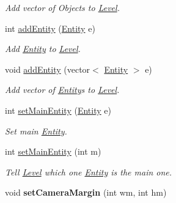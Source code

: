 \begin{DoxyCompactItemize}
\begin{DoxyCompactList}\small\item\em Add vector of Objects to \hyperlink{classLevel}{Level}. \end{DoxyCompactList}\item 
int \hyperlink{classLevel_a9345e51c6abbc422864bf6954c5f6312}{add\+Entity} (\hyperlink{classEntity}{Entity} e)\hypertarget{classLevel_a9345e51c6abbc422864bf6954c5f6312}{}\label{classLevel_a9345e51c6abbc422864bf6954c5f6312}

\begin{DoxyCompactList}\small\item\em Add \hyperlink{classEntity}{Entity} to \hyperlink{classLevel}{Level}. \end{DoxyCompactList}\item 
void \hyperlink{classLevel_a6c4584d5aa383888461406de600a43c1}{add\+Entity} (vector$<$ \hyperlink{classEntity}{Entity} $>$ e)\hypertarget{classLevel_a6c4584d5aa383888461406de600a43c1}{}\label{classLevel_a6c4584d5aa383888461406de600a43c1}

\begin{DoxyCompactList}\small\item\em Add vector of \hyperlink{classEntity}{Entity}\textquotesingle{}s to \hyperlink{classLevel}{Level}. \end{DoxyCompactList}\item 
int \hyperlink{classLevel_afc8426f1adb6037dd71b26e4bd63db92}{set\+Main\+Entity} (\hyperlink{classEntity}{Entity} e)\hypertarget{classLevel_afc8426f1adb6037dd71b26e4bd63db92}{}\label{classLevel_afc8426f1adb6037dd71b26e4bd63db92}

\begin{DoxyCompactList}\small\item\em Set main \hyperlink{classEntity}{Entity}. \end{DoxyCompactList}\item 
int \hyperlink{classLevel_ab7cf0af8d8c89da5a2dc9d3e3b978637}{set\+Main\+Entity} (int m)\hypertarget{classLevel_ab7cf0af8d8c89da5a2dc9d3e3b978637}{}\label{classLevel_ab7cf0af8d8c89da5a2dc9d3e3b978637}

\begin{DoxyCompactList}\small\item\em Tell \hyperlink{classLevel}{Level} which one \hyperlink{classEntity}{Entity} is the main one. \end{DoxyCompactList}\item 
void {\bfseries set\+Camera\+Margin} (int wm, int hm)\hypertarget{classLevel_a69a4cae59576b540090202ab3c22e8d5}{}\label{classLevel_a69a4cae59576b540090202ab3c22e8d5}


\end{DoxyCompactItemize}
